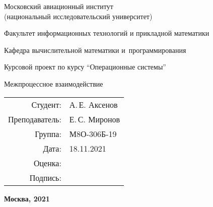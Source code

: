 \begin{titlepage}
\begin{center}
\bfseries

{\Large Московский авиационный институт\\ (национальный исследовательский университет)}

\vspace{48pt}

{\large Факультет информационных технологий и прикладной математики
}

{\large Кафедра вычислительной математики и~программирования}


\vspace{48pt}

Курсовой проект по курсу \enquote{Операционные системы}

\vspace{24pt}

{\Large Межпроцессное взаимодействие}

\end{center}

\vspace{72pt}

\begin{flushright}
\begin{tabular}{rl}
Студент: & А.\,Е. Аксенов \\
Преподаватель: & Е.\,С. Миронов  \\
Группа: & М8О-306Б-19 \\
Дата: & 18.11.2021 \\
Оценка: & \\
Подпись: & \\
\end{tabular}
\end{flushright}

\vfill

\begin{center}
\bfseries
Москва, 2021
\end{center}
\end{titlepage}

\pagebreak
